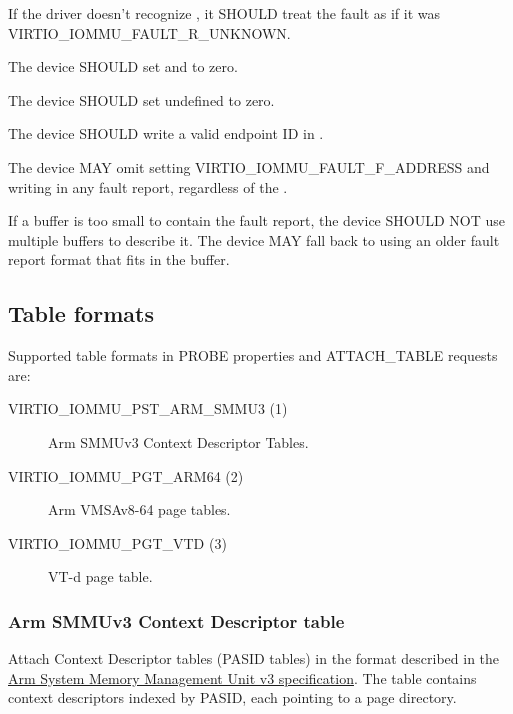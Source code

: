 If the driver doesn't recognize , it SHOULD treat the fault
as if it was VIRTIO_IOMMU_FAULT_R_UNKNOWN.


The device SHOULD set  and  to zero.

The device SHOULD set undefined  to zero.

The device SHOULD write a valid endpoint ID in .

The device MAY omit setting VIRTIO_IOMMU_FAULT_F_ADDRESS and writing
 in any fault report, regardless of the .

If a buffer is too small to contain the fault report\footnotemark, the
device SHOULD NOT use multiple buffers to describe it. The device MAY fall
back to using an older fault report format that fits in the buffer.


\subsection{Table formats}\label{sec:Device Types / IOMMU Device / Table Formats}

Supported table formats in PROBE properties and ATTACH_TABLE
requests are:
\begin{description}
  \item[VIRTIO_IOMMU_PST_ARM_SMMU3 (1)] Arm SMMUv3 Context
    Descriptor Tables.
  \item[VIRTIO_IOMMU_PGT_ARM64 (2)] Arm VMSAv8-64 page tables.
  \item[VIRTIO_IOMMU_PGT_VTD (3)] VT-d page table.
\end{description}

\subsubsection{Arm SMMUv3 Context Descriptor table}\label{sec:Device Types / IOMMU Device / Table Formats / Arm SMMUv3 Context Descriptor}

Attach Context Descriptor tables (PASID tables) in the format
described in the \hyperref[intro:SMMUv3]{Arm System Memory
Management Unit v3 specification}. The table contains context
descriptors indexed by PASID, each pointing to a page directory.

